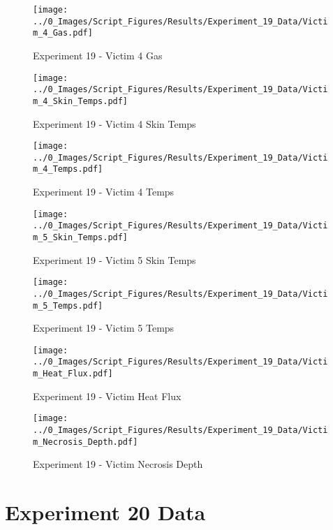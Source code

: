 	\clearpage

	\begin{figure}[H]
		\centering
		\texttt{[image: ../0\_Images/Script\_Figures/Results/Experiment\_19\_Data/Victim\_4\_Gas.pdf]}
		\caption[]{Experiment 19 - Victim 4 Gas}
	\end{figure}
 

	\begin{figure}[H]
		\centering
		\texttt{[image: ../0\_Images/Script\_Figures/Results/Experiment\_19\_Data/Victim\_4\_Skin\_Temps.pdf]}
		\caption[]{Experiment 19 - Victim 4 Skin Temps}
	\end{figure}
 
	\clearpage

	\begin{figure}[H]
		\centering
		\texttt{[image: ../0\_Images/Script\_Figures/Results/Experiment\_19\_Data/Victim\_4\_Temps.pdf]}
		\caption[]{Experiment 19 - Victim 4 Temps}
	\end{figure}
 

	\begin{figure}[H]
		\centering
		\texttt{[image: ../0\_Images/Script\_Figures/Results/Experiment\_19\_Data/Victim\_5\_Skin\_Temps.pdf]}
		\caption[]{Experiment 19 - Victim 5 Skin Temps}
	\end{figure}
 
	\clearpage

	\begin{figure}[H]
		\centering
		\texttt{[image: ../0\_Images/Script\_Figures/Results/Experiment\_19\_Data/Victim\_5\_Temps.pdf]}
		\caption[]{Experiment 19 - Victim 5 Temps}
	\end{figure}
 

	\begin{figure}[H]
		\centering
		\texttt{[image: ../0\_Images/Script\_Figures/Results/Experiment\_19\_Data/Victim\_Heat\_Flux.pdf]}
		\caption[]{Experiment 19 - Victim Heat Flux}
	\end{figure}
 
	\clearpage

	\begin{figure}[H]
		\centering
		\texttt{[image: ../0\_Images/Script\_Figures/Results/Experiment\_19\_Data/Victim\_Necrosis\_Depth.pdf]}
		\caption[]{Experiment 19 - Victim Necrosis Depth}
	\end{figure}
 

\clearpage		\large
\section{Experiment 20 Data} \label{App:Exp20Results} 

